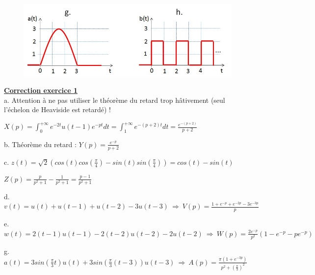 \documentclass[11pt]{report}
\begin{document}
	\begin{figure}[h!]
		\centering
		\includegraphics[scale=0.5]{images/Exo_2_1_b.jpg} 
	\end{figure}
	
	
	
	\vspace{1\baselineskip}
	
	\textbf{\underline{Correction exercice 1}}\\
	a. Attention à ne pas utiliser le théorème du retard trop hâtivement (seul l'échelon de Heaviside est retardé) !
	
	$X(p) = \int_{0}^{+\infty} e^{-2t}u(t-1)e^{-pt}dt=\int_{1}^{+\infty} e^{-(p+2)t}dt=\frac{e^{-(p+2)}}{p+2}$
	
	\vspace{0.5\baselineskip}
	
	b. Théorème du retard : $Y(p) = \frac{e^{-p}}{p+2}$
	
	\vspace{0.5\baselineskip}
	
	c. $z(t) = \sqrt{2}(cos(t)cos(\frac{\pi}{4})-sin(t)sin(\frac{\pi}{4}))=cos(t)-sin(t)$
	
	$Z(p) = \frac{p}{p^{2}+1}-\frac{1}{p^{2}+1}=\frac{p-1}{p^{2}+1}$
	
	\vspace{0.5\baselineskip}
	
	d. $v(t) = u(t)+u(t-1)+u(t-2)-3u(t-3)~\Rightarrow~V(p)=\frac{1+e^{-p}+e^{-2p}-3e^{-3p}}{p}$ 
	
	\vspace{0.5\baselineskip}
	
	e. $w(t) = 2(t-1)u(t-1)-2(t-2)u(t-2)-2u(t-2)~\Rightarrow~W(p)=\frac{2e^{-p}}{p^{2}}(1-e^{-p}-pe^{-p})$ 
	
	\vspace{0.5\baselineskip}
	
	g. $a(t)=3sin(\frac{\pi}{3}t)u(t)+3sin(\frac{\pi}{3}(t-3))u(t-3)~\Rightarrow~A(p)=\frac{\pi(1+e^{-3p})}{p^{2}+(\frac{\pi}{3})^{2}}$
	
	\vspace{0.5\baselineskip}
	
\end{document}
